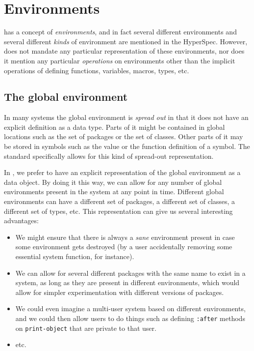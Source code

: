 \chapter{Environments}
\label{chap-environments}

\cl{} has a concept of \emph{environments}, and in fact several
different environments and several different \emph{kinds} of
environment are mentioned in the HyperSpec.  However, \cl{} does not
mandate any particular representation of these environments, nor does
it mention any particular \emph{operations} on environments other than
the implicit operations of defining functions, variables, macros,
types, etc. 

\section{The global environment}
\label{sec-the-global-environment}

In many \cl{} systems the global environment is \emph{spread out} in
that it does not have an explicit definition as a data type.  Parts of
it might be contained in global locations such as the set of packages
or the set of classes.  Other parts of it may be stored in symbols
such as the value or the function definition of a symbol.  The
standard specifically allows for this kind of spread-out
representation.  

In \sysname{}, we prefer to have an explicit representation of the
global environment as a data object.  By doing it this way, we can
allow for any number of global environments present in the system at
any point in time.  Different global environments can have a different
set of packages, a different set of classes, a different set of types,
etc.  This representation can give us several interesting advantages: 

\begin{itemize}
\item We might ensure that there is always a \emph{sane} environment
  present in case some environment gets destroyed (by a user
  accidentally removing some essential system function, for instance).
\item We can allow for several different packages with the same name
  to exist in a system, as long as they are present in different
  environments, which would allow for simpler experimentation with
  different versions of packages. 
\item We could even imagine a multi-user system based on different
  environments, and we could then allow users to do things such as
  defining \texttt{:after} methods on \texttt{print-object} that are
  private to that user. 
\item etc.
\end{itemize}

